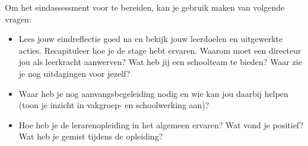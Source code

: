 \documentclass[a4paper,12pt,twoside]{article}%
\begin{document}
Om het eindassessment voor te bereiden, kan je gebruik maken van volgende vragen:
\begin{itemize}
	\item Lees jouw eindreflectie goed na en bekijk jouw leerdoelen en uitgewerkte acties. Recapituleer hoe je de stage hebt ervaren. Waarom moet een directeur jou als leerkracht aanwerven? Wat heb jij een schoolteam te bieden? Waar zie je nog uitdagingen voor jezelf? 
	\item Waar heb je nog aanvangsbegeleiding nodig en wie kan jou daarbij helpen (toon je inzicht in vakgroep- en schoolwerking aan)?
	\item Hoe heb je de lerarenopleiding in het algemeen ervaren? Wat vond je positief? Wat heb je gemist tijdens de opleiding?
\end{itemize} 
\end{document}
